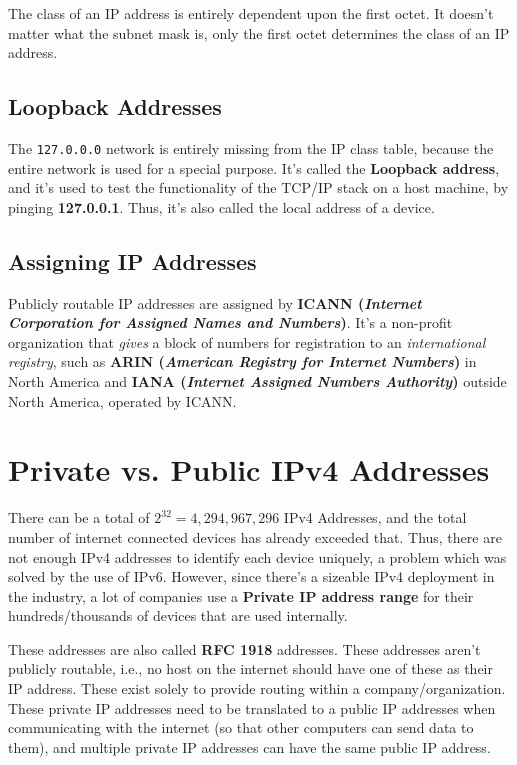 The class of an IP address is entirely dependent upon the first octet. It doesn't matter what the subnet mask is, only the first octet determines the class of an IP address. 

\subsection{Loopback Addresses}
The \verb|127.0.0.0| network is entirely missing from the IP class table, because the entire network is used for a special purpose.  It's called the \textbf{Loopback address}, and it's used to test the functionality of the TCP/IP stack on a host machine, by pinging \textbf{127.0.0.1}. Thus, it's also called the local address of a device. 

\subsection{Assigning IP Addresses}
Publicly routable IP addresses are assigned by \textbf{ICANN (\textit{Internet Corporation for Assigned Names and Numbers})}. It's a non-profit organization that \textit{gives} a block of numbers for registration to an \textit{international registry}, such as \textbf{ARIN (\textit{American Registry for Internet Numbers})} in North America and \textbf{IANA (\textit{Internet Assigned Numbers Authority})} outside North America, operated by ICANN. 

\section{Private vs. Public IPv4 Addresses}
There can be a total of $2^{32} = 4,294,967,296$ IPv4 Addresses, and the total number of internet connected devices has already exceeded that. Thus, there are not enough IPv4 addresses to identify each device uniquely, a problem which was solved by the use of IPv6. However, since there's a sizeable IPv4 deployment in the industry, a lot of companies use a \textbf{Private IP address range} for their hundreds/thousands of devices that are used internally. 

These addresses are also called \textbf{RFC 1918} addresses. These addresses aren't publicly routable, i.e., no host on the internet should have one of these as their IP address. These exist solely to provide routing within a company/organization. These private IP addresses need to be translated to a public IP addresses when communicating with the internet (so that other computers can send data to them), and multiple private IP addresses can have the same public IP address. 

